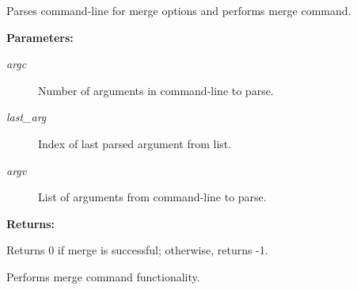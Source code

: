 Parses command-line for merge options and performs merge command.

\begin{Desc}
\item[{\bf Parameters: }]\par
\begin{description}
\item[
{\em argc}]Number of arguments in command-line to parse. \item[
{\em last\_\-arg}]Index of last parsed argument from list. \item[
{\em argv}]List of arguments from command-line to parse.

\end{description}
\end{Desc}
\begin{Desc}
\item[{\bf Returns: }]\par
Returns 0 if merge is successful; otherwise, returns -1.

\end{Desc}
Performs merge command functionality. 